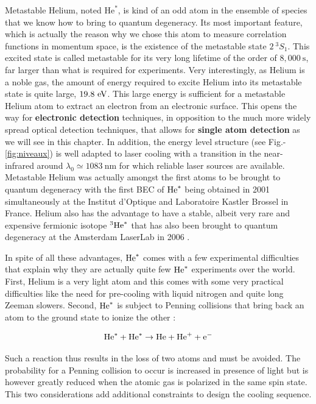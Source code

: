 Metastable Helium, noted $\mathrm{He}^*$, is kind of an odd atom in the ensemble of species that we know how to bring to quantum degeneracy. Its most important feature, which is actually the reason why we chose this atom to measure correlation functions in momentum space, is the existence of the metastable state $2 \ ^3 S_1$. This excited state is called metastable for its very long lifetime of the order of $8,000 \ \mathrm{s}$, far larger than what is required for experiments. Very interestingly, as Helium is a noble gas, the amount of energy required to excite Helium into its metastable state is quite large, $19.8 \ \rm{eV}$. This large energy is sufficient for a metastable Helium atom to extract an electron from an electronic surface. This opens the way for \textbf{electronic detection} techniques, in opposition to the much more widely spread optical detection techniques, that allows for \textbf{single atom detection} as we will see in this chapter. In addition, the energy level structure (see Fig.-\ref{fig:niveaux}) is well adapted to laser cooling with a transition in the near-infrared around $\lambda_0 \simeq 1083 \ \mathrm{nm}$ for which reliable laser sources are available. Metastable Helium was actually amongst the first atoms to be brought to quantum degeneracy with the first BEC of $\mathrm{He}^*$ being obtained in 2001 simultaneously at the Institut d'Optique \cite{robert2001bose} and Laboratoire Kastler Brossel \cite{dos2001bose} in France. Helium also has the advantage to have a stable, albeit very rare and expensive fermionic isotope $^3 \mathrm{He}^*$ that has also been brought to quantum degeneracy at the Amsterdam LaserLab in 2006 \cite{mcnamara2006degenerate}.

In spite of all these advantages, $\mathrm{He}^*$ comes with a few experimental difficulties that explain why they are actually quite few $\mathrm{He}^*$ experiments over the world. First, Helium is a very light atom and this comes with some very practical difficulties like the need for pre-cooling with liquid nitrogen and quite long Zeeman slowers. Second, $\mathrm{He}^*$ is subject to Penning collisions that bring back an atom to the ground state to ionize the other \cite{dos2001penning}:

\begin{equation}
    \mathrm{He}^* + \mathrm{He}^* \rightarrow \mathrm{He} + \mathrm{He}^+ + \mathrm{e}^{-}
\end{equation}

\noindent Such a reaction thus results in the loss of two atoms and must be avoided. The probability for a Penning collision to occur is increased in presence of light \cite{bardou1992magneto} but is however greatly reduced when the atomic gas is polarized in the same spin state. This two considerations add additional constraints to design the cooling sequence.




